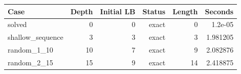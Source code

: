 {\small
\begin{tabular}{lrrrrr}
\hline
Case & Depth & Initial LB & Status & Length & Seconds \\
\hline
solved & 0 & 0 & exact & 0 & 1.2e-05 \\
shallow\_sequence & 3 & 3 & exact & 3 & 1.981205 \\
random\_1\_10 & 10 & 7 & exact & 9 & 2.082876 \\
random\_2\_15 & 15 & 9 & exact & 14 & 2.418875 \\
\hline
\end{tabular}
}
